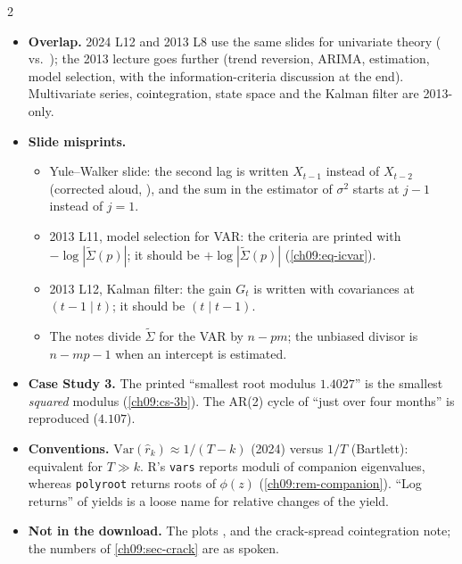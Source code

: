 \begin{paracol}{2}
\begin{coursenote}
\begin{itemize}
  \item \textbf{Overlap.} 2024 L12 and 2013 L8 use the same slides for univariate theory ( vs.\ ); the 2013 lecture goes further (trend reversion, ARIMA,
        estimation, model selection, with the information-criteria discussion at the end). Multivariate series, cointegration, state space and the Kalman filter are 2013-only.
  \item \textbf{Slide misprints.}
  \begin{itemize}
    \item Yule--Walker slide: the second lag is written $X_{t-1}$ instead of $X_{t-2}$ (corrected aloud, ), and the sum in the estimator of $\sigma^2$
        starts at $j-1$ instead of $j=1$.
    \item 2013 L11, model selection for VAR: the criteria are printed with $-\log|\tilde\Sigma(p)|$; it should be $+\log|\tilde\Sigma(p)|$ (\cref{ch09:eq-icvar}).
    \item 2013 L12, Kalman filter: the gain $G_t$ is written with covariances at $(t-1\mid t)$; it should be $(t\mid t-1)$.
    \item The notes divide $\tilde\Sigma$ for the VAR by $n-pm$; the unbiased
        divisor is $n-mp-1$ when an intercept is estimated.
  \end{itemize}
  \item \textbf{Case Study 3.} The printed ``smallest root modulus $1.4027$'' is the smallest \emph{squared} modulus (\cref{ch09:cs-3b}). The AR(2) cycle of ``just over four months'' is
        reproduced ($4.107$).
  \item \textbf{Conventions.} $\mathrm{Var}(\hat r_k)\approx1/(T-k)$ (2024) versus $1/T$ (Bartlett): equivalent for $T\gg k$. R's \texttt{vars} reports moduli of companion eigenvalues, whereas
        \texttt{polyroot} returns roots of $\phi(z)$ (\cref{ch09:rem-companion}). ``Log returns'' of yields is a loose name for relative changes of the yield.
  \item \textbf{Not in the download.} The plots ,  and the crack-spread cointegration note; the numbers of \cref{ch09:sec-crack} are as spoken.
\end{itemize}
\end{coursenote}


\end{paracol}
